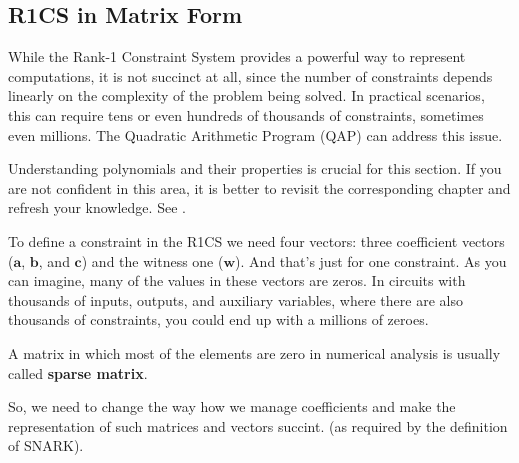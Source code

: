 \documentclass[../lecture-notes-148x210.tex]{subfiles}
\begin{document}
\subsection{R1CS in Matrix Form}

While the Rank-1 Constraint System provides a powerful way to represent computations, it is not 
succinct at all, since the number of constraints depends linearly on the complexity of the problem 
being solved. In practical scenarios, this can require tens or even hundreds of thousands of 
constraints, sometimes even millions. The Quadratic Arithmetic Program (QAP) can address this issue.

\begin{remark}
    Understanding polynomials and their properties is crucial for this section. If you are not 
    confident in this area, it is better to revisit the corresponding chapter and refresh your
    knowledge. See .
\end{remark}

To define a constraint in the R1CS we need four vectors: three coefficient vectors ($\mathbf{a}$, $\mathbf{b}$, and
$\mathbf{c}$) and the witness one ($\mathbf{w}$). And that's just for one constraint. As you can imagine, many of
the values in these vectors are zeros. In circuits with thousands of inputs, outputs, and auxiliary
variables, where there are also thousands of constraints, you could end up with a millions of zeroes.

\begin{remark}
    A matrix in which most of the elements are zero in numerical analysis is usually called \textbf{sparse
    matrix}.
\end{remark}

So, we need to change the way how we manage coefficients and make the representation of such matrices and vectors succint.
(as required by the definition of SNARK).
\end{document}

